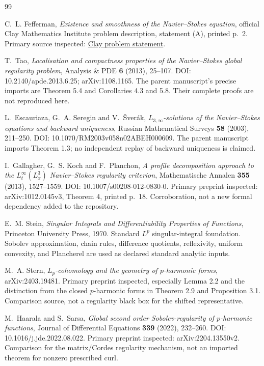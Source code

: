 \documentclass[11pt,a4paper]{article}
\theoremstyle{definition}
\theoremstyle{remark}
\numberwithin{equation}{section}
\begin{document}
\begingroup
\small
{}
\begin{thebibliography}{99}

C.~L. Fefferman, \emph{Existence and smoothness of the Navier--Stokes equation}, official Clay Mathematics Institute problem description, statement (A), printed p.~2. Primary source inspected: \href{https://www.claymath.org/wp-content/uploads/2022/06/navierstokes.pdf}{Clay problem statement}.

T.~Tao, \emph{Localisation and compactness properties of the Navier--Stokes global regularity problem}, Analysis \& PDE \textbf{6} (2013), 25--107. DOI: 10.2140/apde.2013.6.25; arXiv:1108.1165. The parent manuscript's precise imports are Theorem 5.4 and Corollaries 4.3 and 5.8. Their complete proofs are not reproduced here.

L.~Escauriaza, G.~A. Seregin and V.~\v Sver\'ak, \emph{\(L_{3,\infty}\)-solutions of the Navier--Stokes equations and backward uniqueness}, Russian Mathematical Surveys \textbf{58} (2003), 211--250. DOI: 10.1070/RM2003v058n02ABEH000609. The parent manuscript imports Theorem 1.3; no independent replay of backward uniqueness is claimed.

I.~Gallagher, G.~S. Koch and F.~Planchon, \emph{A profile decomposition approach to the \(L^\infty_t(L^3_x)\) Navier--Stokes regularity criterion}, Mathematische Annalen \textbf{355} (2013), 1527--1559. DOI: 10.1007/s00208-012-0830-0. Primary preprint inspected: arXiv:1012.0145v3, Theorem 4, printed p.~18. Corroboration, not a new formal dependency added to the repository.

E.~M. Stein, \emph{Singular Integrals and Differentiability Properties of Functions}, Princeton University Press, 1970. Standard \(L^p\) singular-integral foundation. Sobolev approximation, chain rules, difference quotients, reflexivity, uniform convexity, and Plancherel are used as declared standard analytic inputs.

M.~A. Stern, \emph{\(L_p\)-cohomology and the geometry of \(p\)-harmonic forms}, arXiv:2403.19481. Primary preprint inspected, especially Lemma 2.2 and the distinction from the closed \(p\)-harmonic forms in Theorem 2.9 and Proposition 3.1. Comparison source, not a regularity black box for the shifted representative.

M.~Haarala and S.~Sarsa, \emph{Global second order Sobolev-regularity of \(p\)-harmonic functions}, Journal of Differential Equations \textbf{339} (2022), 232--260. DOI: 10.1016/j.jde.2022.08.022. Primary preprint inspected: arXiv:2204.13550v2. Comparison for the matrix/Cordes regularity mechanism, not an imported theorem for nonzero prescribed curl.


\end{thebibliography}
\end{document}
